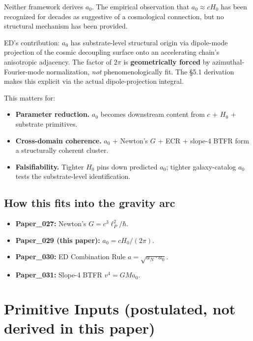 \documentclass[11pt,a4paper]{article}
\begin{document}
Neither framework derives $a_0$. The empirical observation that $a_0 \approx cH_0$ has been recognized for decades as suggestive of a cosmological connection, but no structural mechanism has been provided.

ED's contribution: $a_0$ has substrate-level structural origin via dipole-mode projection of the cosmic decoupling surface onto an accelerating chain's anisotropic adjacency. The factor of $2\pi$ is \textbf{geometrically forced} by azimuthal-Fourier-mode normalization, \emph{not} phenomenologically fit. The \S5.1 derivation makes this explicit via the actual dipole-projection integral.

This matters for:

\begin{itemize}[noitemsep]
\item \textbf{Parameter reduction.} $a_0$ becomes downstream content from $c$ + $H_0$ + substrate primitives.
\item \textbf{Cross-domain coherence.} $a_0$ + Newton's $G$ + ECR + slope-4 BTFR form a structurally coherent cluster.
\item \textbf{Falsifiability.} Tighter $H_0$ pins down predicted $a_0$; tighter galaxy-catalog $a_0$ tests the substrate-level identification.
\end{itemize}

\subsection{How this fits into the gravity arc}

\begin{itemize}[noitemsep]
\item \textbf{Paper\_027:} Newton's $G = c^3\ell_P^2/\hbar$.
\item \textbf{Paper\_029 (this paper):} $a_0 = cH_0/(2\pi)$.
\item \textbf{Paper\_030:} ED Combination Rule $a = \sqrt{a_N \cdot a_0}$.
\item \textbf{Paper\_031:} Slope-4 BTFR $v^4 = GMa_0$.
\end{itemize}

\section{Primitive Inputs (postulated, not derived in this paper)}
\end{document}
